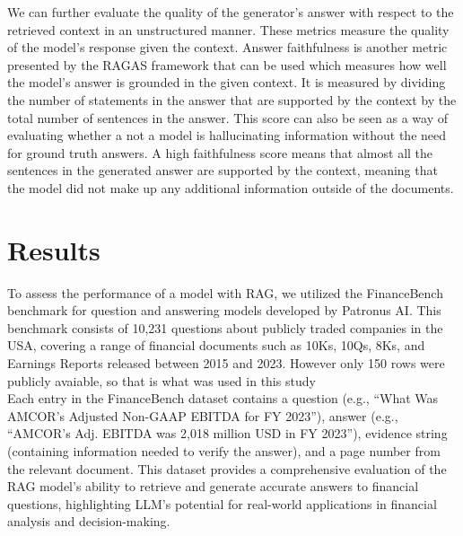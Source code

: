 \documentclass{article}
\begin{document}
    \noindent We can further evaluate the quality of the generator's answer with respect to the retrieved context in an unstructured manner. These metrics measure the quality of the model's response given the context. Answer faithfulness is another metric presented by the RAGAS framework that can be used which measures how well the model's answer is grounded in the given context. It is measured by dividing the number of statements in the answer that are supported by the context by the total number of sentences in the answer. This score can also be seen as a way of evaluating whether a not a model is hallucinating information without the need for ground truth answers. A high faithfulness score means that almost all the sentences in the generated answer are supported by the context, meaning that the model did not make up any additional information outside of the documents. 

    \section{Results}
    To assess the performance of a model with RAG, we utilized the FinanceBench benchmark for question and answering models developed by Patronus AI. This benchmark consists of 10,231 questions about publicly traded companies in the USA, covering a range of financial documents such as 10Ks, 10Qs, 8Ks, and Earnings Reports released between 2015 and 2023. However only 150 rows were publicly avaiable, so that is what was used in this study 
    \\
    
    \noindent Each entry in the FinanceBench dataset contains a question (e.g., “What Was AMCOR’s Adjusted Non-GAAP EBITDA for FY 2023”), answer (e.g., “AMCOR’s Adj. EBITDA was 2,018 million USD in FY 2023”), evidence string (containing information needed to verify the answer), and a page number from the relevant document. This dataset provides a comprehensive evaluation of the RAG model's ability to retrieve and generate accurate answers to financial questions, highlighting LLM's potential for real-world applications in financial analysis and decision-making. 
\\
\end{document}
